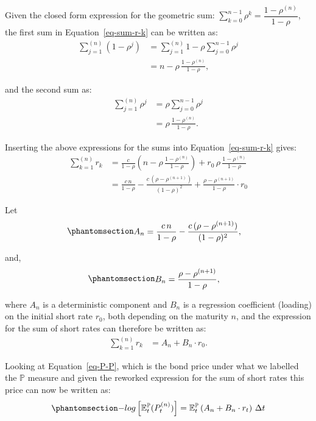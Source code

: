 \documentclass[
  letterpaper,
  DIV=11,
  numbers=noendperiod]{scrreprt}
\begin{document}
Given the closed form expression for the geometric sum:
\(\sum_{k=0}^{n-1} \rho^k =\dfrac{1-\rho^{(n)}}{1-\rho}\), the first sum
in Equation~\ref{eq-sum-r-k} can be written as:
\begin{align}
    \sum_{j=1}^{(n)} (1-\rho^j) &= \sum_{j=1}^{(n)} 1 - \rho \sum_{j=0}^{n-1} \rho^j \nonumber \\
    &= n - \rho \, \frac{1-\rho^{(n)}}{1-\rho},
\end{align}

and the second sum as:
\begin{align}
    \sum_{j=1}^{(n)} \rho^j &= \rho \sum_{j=0}^{n-1} \rho^j \nonumber \\
    &= \rho \, \frac{1-\rho^{(n)}}{1-\rho}.
\end{align}

Inserting the above expressions for the sums into
Equation~\ref{eq-sum-r-k} gives:
\begin{align}
        \sum_{k=1}^{(n)} r_k &= \frac{c}{1-\rho} \left(n - \rho \, \frac{1-\rho^{(n)}}{1-\rho}\right) + r_0 \, \rho \, \frac{1-\rho^{(n)}}{1-\rho} \nonumber \\  
        &= \frac{c\,n}{1-\rho} - \frac{c\,(\rho-\rho^{(n+1)})}{(1-\rho)^2} + \frac{\rho-\rho^{(n+1)}}{1-\rho} \cdot r_0
\end{align}

Let \begin{equation}\protect\phantomsection\label{eq-An}{
\begin{align}
    A_n &= \frac{c\,n}{1-\rho} - \frac{c\,(\rho-\rho^{(n+1)})}{(1-\rho)^2},
\end{align}
}\end{equation}

and, \begin{equation}\protect\phantomsection\label{eq-Bn}{
\begin{align}
    B_n &= \frac{\rho-\rho^{(n+1)}}{1-\rho},
\end{align}
}\end{equation}

where \(A_n\) is a deterministic component and \(B_n\) is a regression
coefficient (loading) on the initial short rate \(r_0\), both depending
on the maturity \(n\), and the expression for the sum of short rates can
therefore be written as:
\begin{align}
    \sum_{k=1}^{(n)} r_k &= A_n + B_n \cdot r_0.
\end{align}

Looking at Equation~\ref{eq-P-P}, which is the bond price under what we
labelled the \(\mathbb{P}\) measure and given the reworked expression
for the sum of short rates this price can now be written as:
\begin{equation}\protect\phantomsection\label{eq-logP1}{
\begin{align}
    -log\left[ \mathbb{E}_t^{\mathbb{P}}(P_t^{(n)}) \right] = \mathbb{E}_t^{\mathbb{P}}\left(A_n + B_n \cdot r_t\right) \, \Delta t
\end{align}
}\end{equation}
\end{document}
